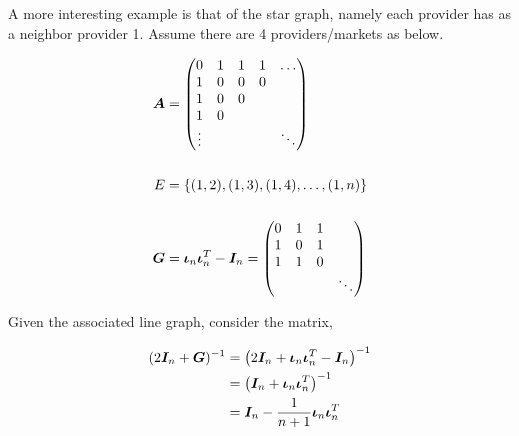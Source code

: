 A more interesting example is that of the star graph, namely each provider has as a neighbor provider 1. Assume there are 4 providers/markets as below.

\vspace{5mm}
\begin{minipage}{.5\textwidth}
    \resizebox{\textwidth}{!}{}
\end{minipage}
\begin{minipage}{.5\textwidth}
    \begin{equation*}
        \begin{split}
            \matr{A} &= \begin{pmatrix}
                0      & 1 & 1 & 1 & \ldots \\
                1      & 0 & 0 & 0 &        \\
                1      & 0 & 0 &   &        \\
                1      & 0 &   &   &        \\
                \vdots &   &   &   & \ddots
            \end{pmatrix} \\
            \vspace{5mm} \\
            E &= \set{(1, 2), (1, 3), (1, 4), \ldots, (1, n)} \\
            \vspace{5mm} \\
            \G &= \matr{\iota}_n \matr{\iota}_n^T - \I_n =  \begin{pmatrix}
                0 & 1 & 1 &        \\
                1 & 0 & 1 &        \\
                1 & 1 & 0 &        \\
                  &   &   & \ddots
            \end{pmatrix}
        \end{split}
    \end{equation*}
\end{minipage}
\vspace{5mm}

Given the associated line graph, consider the matrix,

\begin{equation*}
    \begin{split}
        (2\bm{I}_n + \bm{G})^{-1} &= \left( 2\bm{I}_n + \bm{\iota}_n \bm{\iota}_n^T - \bm{I}_n \right)^{-1}\\
        &= \left( \bm{I}_n + \bm{\iota}_n \bm{\iota}_n^T \right)^{-1} \\
        &= \bm{I}_n - \frac{1}{n + 1} \bm{\iota}_n \bm{\iota}_n^T
    \end{split}
\end{equation*}

